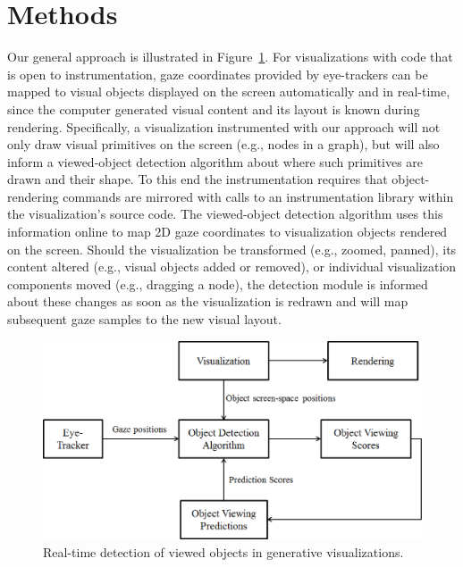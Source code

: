 ﻿\section{Methods}\label{sec:Methods}

Our general approach is illustrated in Figure~\ref{fig:systemBlockDiagram}. For visualizations with code that is open to instrumentation, gaze coordinates provided by eye-trackers can be mapped to visual objects displayed on the screen automatically and in real-time, since the computer generated visual content and its layout is known during rendering.  Specifically, a visualization instrumented with our approach will not only draw visual primitives on the screen (e.g., nodes in a graph), but will also inform a viewed-object detection algorithm about where such primitives are drawn and their shape. To this end the instrumentation requires that object-rendering commands are mirrored with calls to an instrumentation library within the visualization's source code. The viewed-object detection algorithm uses this information online to map 2D gaze coordinates to visualization objects rendered on the screen. Should the visualization be transformed (e.g., zoomed, panned), its content altered (e.g., visual objects added or removed), or individual visualization components moved (e.g., dragging a node), the detection module is informed about these changes as soon as the visualization is redrawn and will map subsequent gaze samples to the new visual layout. 

\begin{figure}[htb]
  \centering
  \includegraphics[width=0.9\linewidth]{images/systemBlockDiagram.eps}
  \caption{Real-time detection of viewed objects in generative visualizations.}
	\label{fig:systemBlockDiagram}
\end{figure}

